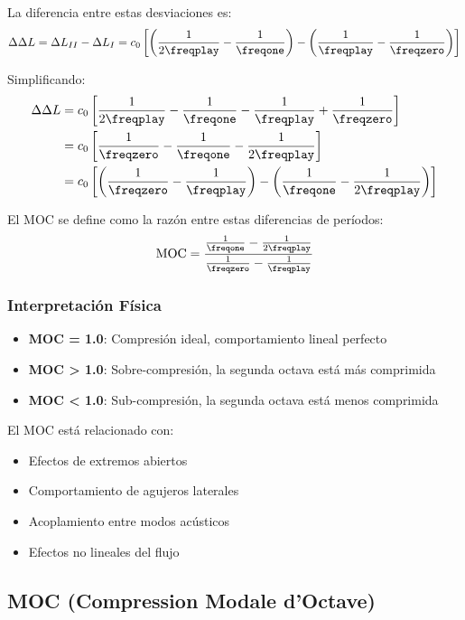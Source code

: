 La diferencia entre estas desviaciones es:
\begin{equation}
\Delta\Delta L = \Delta L_{II} - \Delta L_I = c_0\left[\left(\frac{1}{2\freqplay} - \frac{1}{\freqone}\right) - \left(\frac{1}{\freqplay} - \frac{1}{\freqzero}\right)\right]
\end{equation}

Simplificando:
\begin{align}
\Delta\Delta L &= c_0\left[\frac{1}{2\freqplay} - \frac{1}{\freqone} - \frac{1}{\freqplay} + \frac{1}{\freqzero}\right] \\
&= c_0\left[\frac{1}{\freqzero} - \frac{1}{\freqone} - \frac{1}{2\freqplay}\right] \\
&= c_0\left[\left(\frac{1}{\freqzero} - \frac{1}{\freqplay}\right) - \left(\frac{1}{\freqone} - \frac{1}{2\freqplay}\right)\right]
\end{align}

El MOC se define como la razón entre estas diferencias de períodos:
\begin{equation}
\text{MOC} = \frac{\frac{1}{\freqone} - \frac{1}{2\freqplay}}{\frac{1}{\freqzero} - \frac{1}{\freqplay}}
\label{eq:moc_def}
\end{equation}

\subsubsection{Interpretación Física}

\begin{itemize}
    \item \textbf{MOC = 1.0}: Compresión ideal, comportamiento lineal perfecto
    \item \textbf{MOC > 1.0}: Sobre-compresión, la segunda octava está más comprimida
    \item \textbf{MOC < 1.0}: Sub-compresión, la segunda octava está menos comprimida
\end{itemize}

El MOC está relacionado con:
\begin{itemize}
    \item Efectos de extremos abiertos
    \item Comportamiento de agujeros laterales
    \item Acoplamiento entre modos acústicos
    \item Efectos no lineales del flujo
\end{itemize}

\subsection{MOC (Compression Modale d'Octave)}

